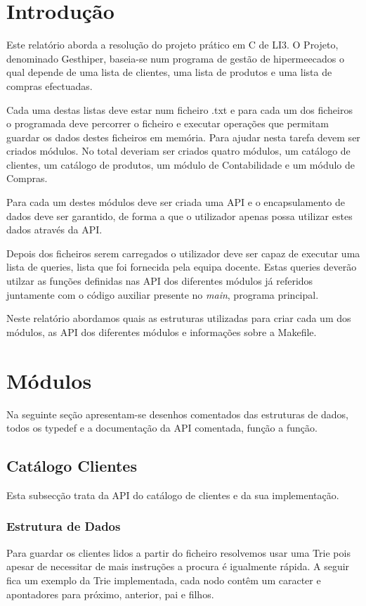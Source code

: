 \documentclass[10pt] {article}
\begin{document}
\section{Introdução}
\par Este relatório aborda a resolução do projeto prático em C de LI3. O Projeto, denominado Gesthiper, baseia-se 
num programa de gestão de hipermeecados o qual depende de uma lista de clientes, uma lista de produtos e uma 
lista de compras efectuadas. \par Cada uma destas listas deve estar num ficheiro .txt e para cada um dos ficheiros o 
programada deve percorrer o ficheiro e executar operações que permitam guardar os dados destes 
ficheiros em memória. Para ajudar nesta tarefa devem ser criados módulos. No total deveriam ser criados quatro 
módulos, um catálogo de clientes, um catálogo de produtos, um módulo de Contabilidade e um módulo de Compras.
\par Para cada um destes módulos deve ser criada uma API e o encapsulamento de dados deve ser garantido, de 
forma a que o utilizador apenas possa utilizar estes dados através da API.
\par Depois dos ficheiros serem carregados o utilizador deve ser capaz de executar uma lista de queries, lista que 
foi fornecida pela equipa docente. Estas queries deverão utilzar as funções definidas nas API dos diferentes 
módulos já referidos juntamente com o código auxiliar presente no \emph{main}, programa principal.
\par Neste relatório abordamos quais as estruturas utilizadas para criar cada um dos módulos, as API dos diferentes 
módulos e informações sobre a Makefile.

\newpage
\section{Módulos}
Na seguinte seção apresentam-se desenhos comentados das estruturas de dados,
todos os typedef e a documentação da API comentada, função a função.


\subsection{Catálogo Clientes}
\par Esta subsecção trata da API do catálogo de clientes e da sua implementação.

\subsubsection{Estrutura de Dados}
\par
Para guardar os clientes lidos a partir do ficheiro resolvemos usar uma Trie pois apesar de
necessitar de mais instruções a procura é igualmente rápida. A seguir fica um exemplo da Trie implementada, 
cada nodo contêm um caracter e apontadores para próximo, anterior, pai e filhos.
\end{document}
